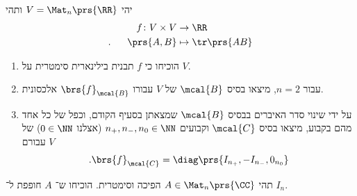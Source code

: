 \documentclass[a4paper,10pt,twoside,openany]{article}
\begin{document}
\begin{exercise}
יהי
$V = \Mat_n\prs{\RR}$
ותהי
\begin{align*}
f \colon V \times V &\to \RR \\
\text{.} \hphantom{lala} \prs{A,B} &\mapsto \tr\prs{AB}
\end{align*}

\begin{enumerate}
\item הוכיחו כי
$f$
תבנית בילינארית סימטרית על
$V$.

\item
עבור
$n = 2$,
מיצאו בסיס
$\mcal{B}$
של
$V$
עבורו
$\brs{f}_{\mcal{B}}$
אלכסונית.

\item
על ידי שינוי סדר האיברים בבסיס $\mcal{B}$ שמצאתן בסעיף הקודם, וכפל של כל אחד מהם בקבוע, מיצאו בסיס
$\mcal{C}$
וקבועים
$n_+, n_-, n_0 \in \NN$
(אצלנו
$0 \in \NN$)
של
$V$
עבורם
\[\text{.} \brs{f}_{\mcal{C}} = \diag\prs{I_{n_+}, -I_{n_-}, 0_{n_0}}\]
\end{enumerate}
\end{exercise}

\begin{exercise}
תהי
$A \in \Mat_n\prs{\CC}$
הפיכה וסימטרית. הוכיחו ש־%
$A$
חופפת ל־%
$I_n$.
\end{exercise}
\end{document}
